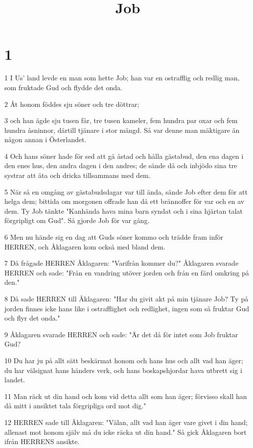 

\title{Job}


\chapter{1}

\par 1 I Us' land levde en man som hette Job; han var en ostrafflig och redlig man, som fruktade Gud och flydde det onda.
\par 2 Åt honom föddes sju söner och tre döttrar;
\par 3 och han ägde sju tusen får, tre tusen kameler, fem hundra par oxar och fem hundra åsninnor, därtill tjänare i stor mängd. Så var denne man mäktigare än någon annan i Österlandet.
\par 4 Och hans söner hade för sed att gå åstad och hålla gästabud, den ena dagen i den enes hus, den andra dagen i den andres; de sände då och inbjödo sina tre systrar att äta och dricka tillsammans med dem.
\par 5 När så en omgång av gästabudsdagar var till ända, sände Job efter dem för att helga dem; bittida om morgonen offrade han då ett brännoffer för var och en av dem. Ty Job tänkte "Kanhända hava mina barn syndat och i sina hjärtan talat förgripligt om Gud". Så gjorde Job för var gång.
\par 6 Men nu hände sig en dag att Guds söner kommo och trädde fram inför HERREN, och Åklagaren kom också med bland dem.
\par 7 Då frågade HERREN Åklagaren: "Varifrån kommer du?" Åklagaren svarade HERREN och sade: "Från en vandring utöver jorden och från en färd omkring på den."
\par 8 Då sade HERREN till Åklagaren: "Har du givit akt på min tjänare Job? Ty på jorden finnes icke hans like i ostrafflighet och redlighet, ingen som så fruktar Gud och flyr det onda."
\par 9 Åklagaren svarade HERREN och sade: "Är det då för intet som Job fruktar Gud?
\par 10 Du har ju på allt sätt beskärmat honom och hans hus och allt vad han äger; du har välsignat hans händers verk, och hans boskapshjordar hava utbrett sig i landet.
\par 11 Man räck ut din hand och kom vid detta allt som han äger; förvisso skall han då mitt i ansiktet tala förgripliga ord mot dig."
\par 12 HERREN sade till Åklagaren: "Välan, allt vad han äger vare givet i din hand; allenast mot honom själv må du icke räcka ut din hand." Så gick Åklagaren bort ifrån HERRENS ansikte.
